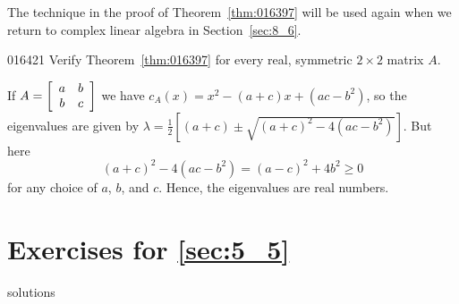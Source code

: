 \noindent The technique in the proof of Theorem~\ref{thm:016397} will be used again when we return to complex linear algebra in Section~\ref{sec:8_6}.

\begin{example}{}{016421}
Verify Theorem~\ref{thm:016397} for every real, symmetric $2 \times 2$ matrix $A$.

\begin{solution}
If $A = 
\left[ \begin{array}{cc}
a & b \\
b & c
\end{array} \right]$ we have $c_{A}(x) = x^{2} - (a + c)x + (ac - b^{2})$, so the eigenvalues are given by $\lambda = \frac{1}{2} [(a + c) \pm \sqrt{(a + c)^2 - 4(ac - b^2)}]$. But here
\begin{equation*}
(a + c)^2 - 4(ac -b^2) = (a - c)^2 + 4b^2 \geq 0
\end{equation*}
for any choice of $a$, $b$, and $c$. Hence, the eigenvalues are real numbers.
\end{solution}
\end{example}

\section*{Exercises for \ref{sec:5_5}}

\begin{Filesave}{solutions}
\end{Filesave}

